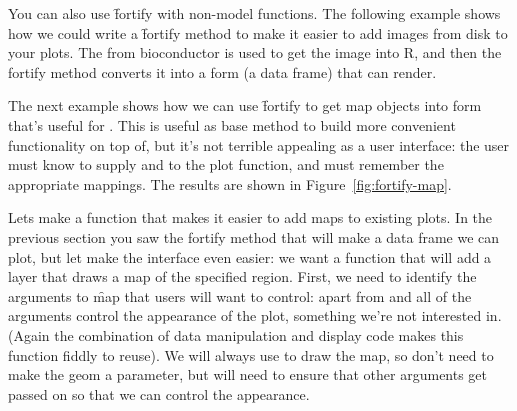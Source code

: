 You can also use \f{fortify} with non-model functions.  The following example shows how we could write a \f{fortify} method to make it easier to add images from disk to your plots.  The  from bioconductor is used to get the image into R, and then the fortify method converts it into a form (a data frame) that \ggplot can render.

% 
% 


The next example shows how we can use \f{fortify} to get map objects into form that's useful for \ggplot.   This is useful as base method to build more convenient functionality on top of, but it's not terrible appealing as a user interface: the user must know to supply  and  to the plot function, and must remember the appropriate mappings.  The results are shown in Figure~\ref{fig:fortify-map}.

% 
% 


Lets make a function that makes it easier to add maps to existing plots.  In the previous section you saw the fortify method that will make a data frame we can plot, but let make the interface even easier: we want a function that will add a layer that draws a map of the specified region.  First, we need to identify the arguments to \f{map} that users will want to control: apart from   and  all of the arguments control the appearance of the plot, something we're not interested in.  (Again the combination of data manipulation and display code makes this function fiddly to reuse).  We will always use  to draw the map, so don't need to make the geom a parameter, but will need to ensure that other arguments get passed on so that we can control the appearance.

